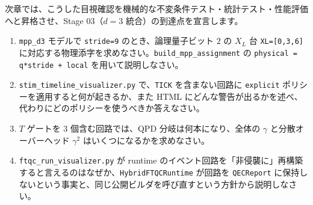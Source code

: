 次章では、こうした目視確認を機械的な不変条件テスト・統計テスト・性能評価へと昇格させ、Stage 03（$d=3$ 統合）の到達点を宣言します。

\begin{exercise}
  \begin{enumerate}
    \item \texttt{mpp\_d3} モデルで \texttt{stride=9} のとき、論理量子ビット $2$ の $X_L$ 台 \texttt{XL=[0,3,6]} に対応する物理添字を求めなさい。\texttt{build\_mpp\_assignment} の \texttt{physical = q*stride + local} を用いて説明しなさい。
    \item \texttt{stim\_timeline\_visualizer.py} で、\texttt{TICK} を含まない回路に \texttt{explicit} ポリシーを適用すると何が起きるか、また HTML にどんな警告が出るかを述べ、代わりにどのポリシーを使うべきか答えなさい。
    \item $T$ ゲートを 3 個含む回路では、QPD 分岐は何本になり、全体の $\gamma$ と分散オーバーヘッド $\gamma^2$ はいくつになるかを求めなさい。
    \item \texttt{ftqc\_run\_visualizer.py} が runtime のイベント回路を「非侵襲に」再構築すると言えるのはなぜか、\texttt{HybridFTQCRuntime} が回路を \texttt{QECReport} に保持しないという事実と、同じ公開ビルダを呼び直すという方針から説明しなさい。
  \end{enumerate}
\end{exercise}
